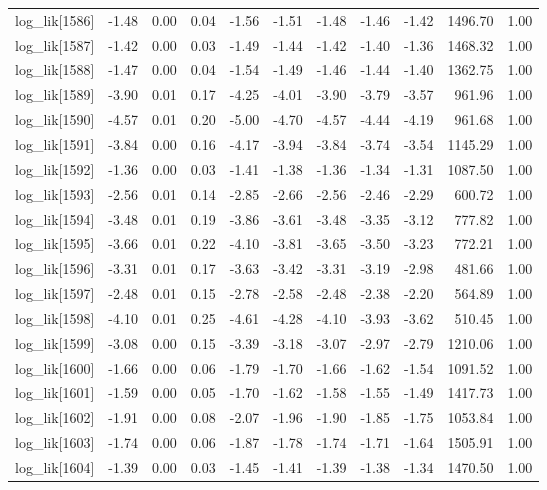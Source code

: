 \begin{table}[ht]
\begin{tabular}{rrrrrrrrrrr}
  log\_lik[1586] & -1.48 & 0.00 & 0.04 & -1.56 & -1.51 & -1.48 & -1.46 & -1.42 & 1496.70 & 1.00 \\ 
  log\_lik[1587] & -1.42 & 0.00 & 0.03 & -1.49 & -1.44 & -1.42 & -1.40 & -1.36 & 1468.32 & 1.00 \\ 
  log\_lik[1588] & -1.47 & 0.00 & 0.04 & -1.54 & -1.49 & -1.46 & -1.44 & -1.40 & 1362.75 & 1.00 \\ 
  log\_lik[1589] & -3.90 & 0.01 & 0.17 & -4.25 & -4.01 & -3.90 & -3.79 & -3.57 & 961.96 & 1.00 \\ 
  log\_lik[1590] & -4.57 & 0.01 & 0.20 & -5.00 & -4.70 & -4.57 & -4.44 & -4.19 & 961.68 & 1.00 \\ 
  log\_lik[1591] & -3.84 & 0.00 & 0.16 & -4.17 & -3.94 & -3.84 & -3.74 & -3.54 & 1145.29 & 1.00 \\ 
  log\_lik[1592] & -1.36 & 0.00 & 0.03 & -1.41 & -1.38 & -1.36 & -1.34 & -1.31 & 1087.50 & 1.00 \\ 
  log\_lik[1593] & -2.56 & 0.01 & 0.14 & -2.85 & -2.66 & -2.56 & -2.46 & -2.29 & 600.72 & 1.00 \\ 
  log\_lik[1594] & -3.48 & 0.01 & 0.19 & -3.86 & -3.61 & -3.48 & -3.35 & -3.12 & 777.82 & 1.00 \\ 
  log\_lik[1595] & -3.66 & 0.01 & 0.22 & -4.10 & -3.81 & -3.65 & -3.50 & -3.23 & 772.21 & 1.00 \\ 
  log\_lik[1596] & -3.31 & 0.01 & 0.17 & -3.63 & -3.42 & -3.31 & -3.19 & -2.98 & 481.66 & 1.00 \\ 
  log\_lik[1597] & -2.48 & 0.01 & 0.15 & -2.78 & -2.58 & -2.48 & -2.38 & -2.20 & 564.89 & 1.00 \\ 
  log\_lik[1598] & -4.10 & 0.01 & 0.25 & -4.61 & -4.28 & -4.10 & -3.93 & -3.62 & 510.45 & 1.00 \\ 
  log\_lik[1599] & -3.08 & 0.00 & 0.15 & -3.39 & -3.18 & -3.07 & -2.97 & -2.79 & 1210.06 & 1.00 \\ 
  log\_lik[1600] & -1.66 & 0.00 & 0.06 & -1.79 & -1.70 & -1.66 & -1.62 & -1.54 & 1091.52 & 1.00 \\ 
  log\_lik[1601] & -1.59 & 0.00 & 0.05 & -1.70 & -1.62 & -1.58 & -1.55 & -1.49 & 1417.73 & 1.00 \\ 
  log\_lik[1602] & -1.91 & 0.00 & 0.08 & -2.07 & -1.96 & -1.90 & -1.85 & -1.75 & 1053.84 & 1.00 \\ 
  log\_lik[1603] & -1.74 & 0.00 & 0.06 & -1.87 & -1.78 & -1.74 & -1.71 & -1.64 & 1505.91 & 1.00 \\ 
  log\_lik[1604] & -1.39 & 0.00 & 0.03 & -1.45 & -1.41 & -1.39 & -1.38 & -1.34 & 1470.50 & 1.00 \\ 

\end{tabular}
\end{table}
